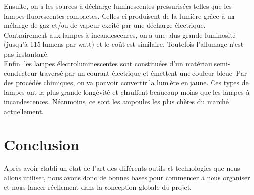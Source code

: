 \documentclass[a4paper, 12pt, french]{article}
\begin{document}
Ensuite, on a les sources à décharge luminescentes pressurisées telles que les lampes fluorescentes compactes. Celles-ci produisent de la lumière grâce à un mélange de gaz et/ou de vapeur excité par une décharge électrique. Contrairement aux lampes à incandescences, on a une plus grande luminosité (jusqu'à 115 lumens par watt) et le coût est similaire. Toutefois l'allumage n'est pas instantané.\\
		
Enfin, les lampes électroluminescentes sont constituées d'un matériau semi-conducteur traversé par un courant électrique et émettent une couleur bleue. Par des procédés chimiques, on va pouvoir convertir la lumière en jaune. Ces types de lampes ont la plus grande longévité et chauffent beaucoup moins que les lampes à incandescences. Néanmoins, ce sont les ampoules les plus chères du marché actuellement. \\
		
	

	
		
		
	
	
	
	





\pagebreak
\section*{Conclusion} %
\label{sec:conclusion}
	Après avoir établi un état de l'art des différents outils et technologies que nous allons utiliser, nous avons donc de bonnes bases pour commencer à nous organiser et nous lancer réellement dans la conception globale du projet.
\end{document}

